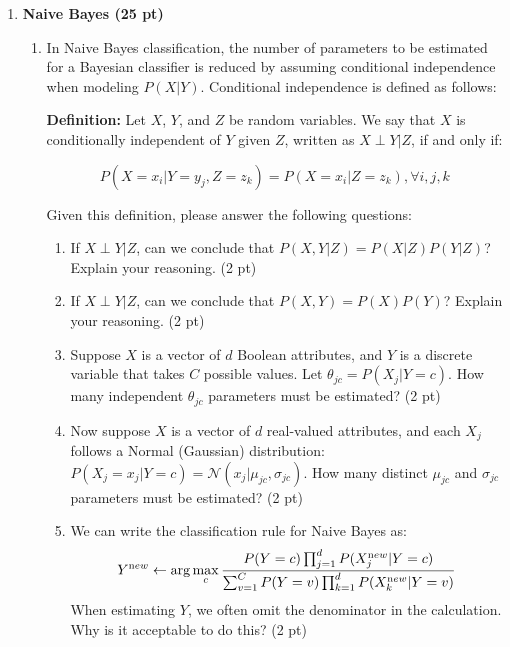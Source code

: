 \documentclass{article}
\theoremstyle{definition}
\theoremstyle{remark}
\newenvironment{Q}
        {%
          \clearpage
          \item
        }
        {%
          \phantom{s} %
          \bigskip
        }
\begin{document}
\begin{enumerate}[font={\Large\bfseries},left=0pt]
	\begin{Q}
		\textbf{\Large  Naive Bayes (25 pt)}

		\begin{enumerate}

			\item  In Naive Bayes classification, the number of parameters to be estimated for a Bayesian classifier is reduced by assuming conditional independence when modeling $P(X|Y)$. Conditional independence is defined as follows:

			      \textbf{Definition:} Let $X$, $Y$, and $Z$ be random variables. We say that $X$ is conditionally independent of $Y$ given $Z$, written as $X \perp Y | Z$, if and only if:


			      \[
				      P(X = x_i|Y = y_j, Z = z_k) = P(X = x_i|Z = z_k), \forall i, j, k
			      \]

			      Given this definition, please answer the following questions:

			      \begin{enumerate}
				      \item If $X \perp Y | Z$, can we conclude that
				            $P(X,Y | Z) = P(X | Z)P(Y | Z)$?
				            Explain your reasoning. (2 pt)

				      \item If $X \perp Y | Z$, can we conclude that
				            $P(X, Y) = P(X)P(Y)$?
				            Explain your reasoning. (2 pt)

				      \item Suppose $X$ is a vector of $d$ Boolean attributes, and $Y$ is a discrete variable that takes $C$ possible values. Let $\theta_{jc} = P(X_j | Y = c)$. How many independent $\theta_{jc}$ parameters must be estimated? (2 pt)

				      \item Now suppose $X$ is a vector of $d$ real-valued attributes, and each $X_j$ follows a Normal (Gaussian) distribution: $P(X_j = x_j | Y = c) = \mathcal{N}(x_j | \mu_{jc}, \sigma_{jc})$. How many distinct $\mu_{jc}$ and $\sigma_{jc}$ parameters must be estimated? (2 pt)\\

				      \item We can write the classification rule for Naive Bayes as:
				            \[
					            Y^{\text new} \leftarrow \arg\max_c \frac{P(Y = c)\prod_{j=1}^{d} P(X_j^{\text new}|Y = c)}{\sum_{v=1}^C P(Y = v)\prod_{k=1}^{d} P(X_k^{\text new}|Y = v)}
				            \]
				            When estimating $Y$, we often omit the denominator in the calculation. Why is it acceptable to do this? (2 pt)


\end{enumerate}
\end{enumerate}
\end{Q}
\end{enumerate}
\end{document}
